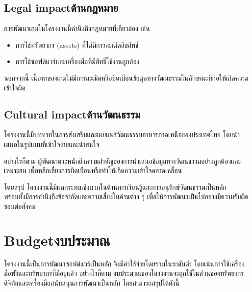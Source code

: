 \subsection{\ifenglish Legal impact\else ด้านกฎหมาย\fi}
    \hspace{1.5em}การพัฒนาเกมในโครงงานนี้คำนึงถึงกฎหมายที่เกี่ยวข้อง เช่น
    \begin{itemize}
        \item การใช้ทรัพยากร (assets) ที่ไม่มีการละเมิดลิขสิทธิ์
        \item การใช้ซอฟต์แวร์และเครื่องมือที่มีสิทธิ์ใช้งานถูกต้อง
    \end{itemize}
    \hspace{1.5em}นอกจากนี้ เนื้อหาของเกมไม่มีการละเมิดหรือบิดเบือนข้อมูลทางวัฒนธรรมในลักษณะที่ก่อให้เกิดความเข้าใจผิด

\subsection{\ifenglish Cultural impact\else ด้านวัฒนธรรม\fi}
    \hspace{1.5em}โครงงานนี้มีบทบาทในการส่งเสริมและเผยแพร่วัฒนธรรมอาหารภาคเหนือของประเทศไทย โดยนำเสนอในรูปแบบที่เข้าใจง่ายและน่าสนใจ\par
    อย่างไรก็ตาม ผู้พัฒนาตระหนักถึงความสำคัญของการนำเสนอข้อมูลทางวัฒนธรรมอย่างถูกต้องและ\\เหมาะสม เพื่อหลีกเลี่ยงการบิดเบือนหรือทำให้เกิดความเข้าใจคลาดเคลื่อน\par
    โดยสรุป โครงงานนี้มีผลกระทบเชิงบวกในด้านการเรียนรู้และการอนุรักษ์วัฒนธรรมเป็นหลัก \\พร้อมทั้งมีการคำนึงถึงข้อจำกัดและความเสี่ยงในด้านต่าง ๆ เพื่อให้การพัฒนาเป็นไปอย่างมีความรับผิดชอบต่อสังคม

\section{\ifenglish Budget\else งบประมาณ\fi}

    \hspace{1.5em}โครงงานนี้เป็นการพัฒนาซอฟต์แวร์เป็นหลัก จึงมีค่าใช้จ่ายโดยรวมในระดับต่ำ โดยเน้นการใช้เครื่องมือฟรีและทรัพยากรที่มีอยู่แล้ว อย่างไรก็ตาม งบประมาณของโครงงานจะถูกใช้ในส่วนของทรัพยากรดิจิทัลและเครื่องมือสนับสนุนการพัฒนาเป็นหลัก โดยสามารถสรุปได้ดังนี้

